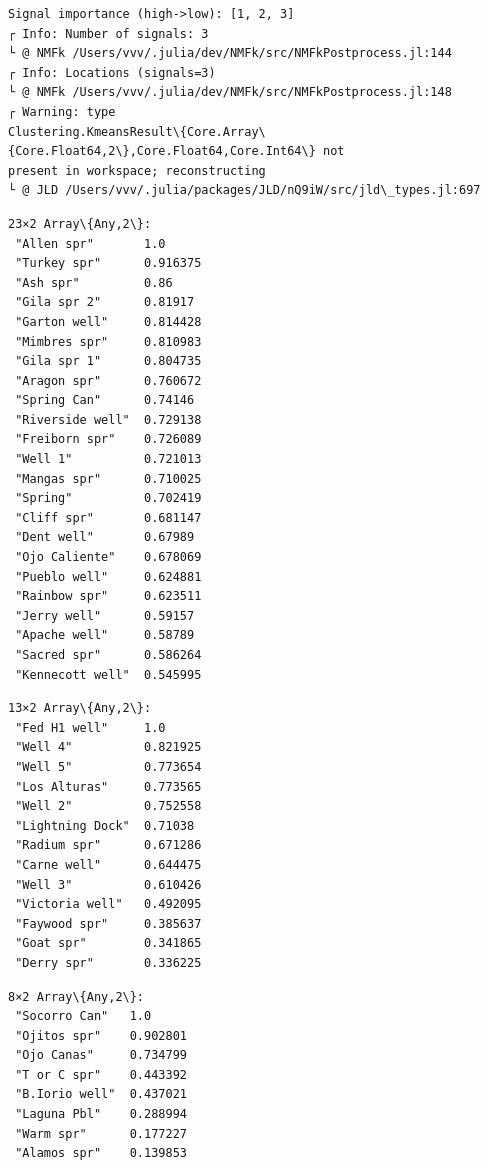\documentclass[11pt]{article}
\begin{document}
    \begin{Verbatim}[commandchars=\\\{\}]
Signal importance (high->low): [1, 2, 3]
┌ Info: Number of signals: 3
└ @ NMFk /Users/vvv/.julia/dev/NMFk/src/NMFkPostprocess.jl:144
┌ Info: Locations (signals=3)
└ @ NMFk /Users/vvv/.julia/dev/NMFk/src/NMFkPostprocess.jl:148
┌ Warning: type
Clustering.KmeansResult\{Core.Array\{Core.Float64,2\},Core.Float64,Core.Int64\} not
present in workspace; reconstructing
└ @ JLD /Users/vvv/.julia/packages/JLD/nQ9iW/src/jld\_types.jl:697
    \end{Verbatim}

    
    \begin{Verbatim}[commandchars=\\\{\}]
23×2 Array\{Any,2\}:
 "Allen spr"       1.0
 "Turkey spr"      0.916375
 "Ash spr"         0.86
 "Gila spr 2"      0.81917
 "Garton well"     0.814428
 "Mimbres spr"     0.810983
 "Gila spr 1"      0.804735
 "Aragon spr"      0.760672
 "Spring Can"      0.74146
 "Riverside well"  0.729138
 "Freiborn spr"    0.726089
 "Well 1"          0.721013
 "Mangas spr"      0.710025
 "Spring"          0.702419
 "Cliff spr"       0.681147
 "Dent well"       0.67989
 "Ojo Caliente"    0.678069
 "Pueblo well"     0.624881
 "Rainbow spr"     0.623511
 "Jerry well"      0.59157
 "Apache well"     0.58789
 "Sacred spr"      0.586264
 "Kennecott well"  0.545995
    \end{Verbatim}

    
    
    \begin{Verbatim}[commandchars=\\\{\}]
13×2 Array\{Any,2\}:
 "Fed H1 well"     1.0
 "Well 4"          0.821925
 "Well 5"          0.773654
 "Los Alturas"     0.773565
 "Well 2"          0.752558
 "Lightning Dock"  0.71038
 "Radium spr"      0.671286
 "Carne well"      0.644475
 "Well 3"          0.610426
 "Victoria well"   0.492095
 "Faywood spr"     0.385637
 "Goat spr"        0.341865
 "Derry spr"       0.336225
    \end{Verbatim}

    
    
    \begin{Verbatim}[commandchars=\\\{\}]
8×2 Array\{Any,2\}:
 "Socorro Can"   1.0
 "Ojitos spr"    0.902801
 "Ojo Canas"     0.734799
 "T or C spr"    0.443392
 "B.Iorio well"  0.437021
 "Laguna Pbl"    0.288994
 "Warm spr"      0.177227
 "Alamos spr"    0.139853
    \end{Verbatim}
\end{document}
